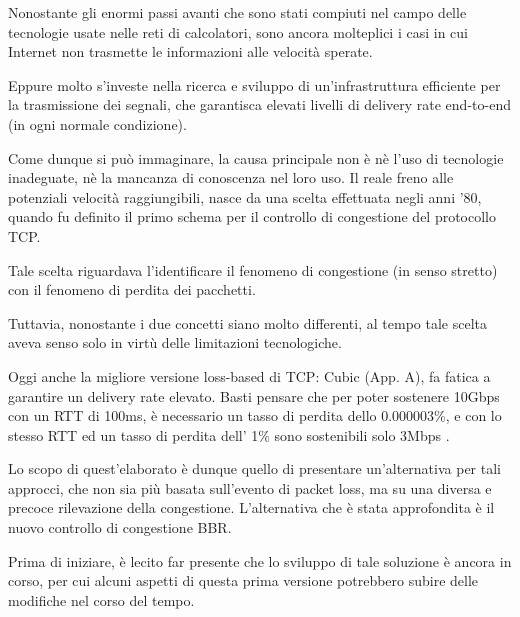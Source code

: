 Nonostante gli enormi passi avanti che sono stati compiuti nel campo delle tecnologie usate nelle reti di calcolatori, sono ancora molteplici i casi in cui Internet non trasmette le informazioni alle velocità sperate. \bigskip

Eppure molto s’investe nella ricerca e sviluppo di un’infrastruttura efficiente per la trasmissione dei segnali, che garantisca elevati livelli di delivery rate end-to-end (in ogni normale condizione). \bigskip

Come dunque si può immaginare, la causa principale non è nè l’uso di tecnologie inadeguate, nè la mancanza di conoscenza nel loro uso. Il reale freno alle potenziali velocità raggiungibili, nasce da una scelta effettuata negli anni '80, quando fu definito il primo schema per il controllo di congestione del protocollo TCP. \bigskip

Tale scelta riguardava l’identificare il fenomeno di congestione (in senso stretto) con il fenomeno di perdita dei pacchetti. \bigskip

Tuttavia, nonostante i due concetti siano molto differenti, al tempo tale scelta aveva senso solo in virtù delle limitazioni tecnologiche. \bigskip

Oggi anche la migliore versione loss-based di TCP: Cubic (App. A), fa fatica a garantire un delivery rate elevato. Basti pensare che per poter sostenere 10Gbps con un RTT di 100ms, è necessario un tasso di perdita dello 0.000003\%, e con lo stesso RTT ed un tasso di perdita dell’ 1\% sono sostenibili solo 3Mbps \cite[p.~12]{ietf:draft-ietf-tcpm-cubic-05}. \bigskip

Lo scopo di quest'elaborato è dunque quello di presentare un'alternativa per tali approcci, che non sia più basata sull'evento di packet loss, ma su una diversa e precoce rilevazione della congestione. L'alternativa che è stata approfondita è il nuovo controllo di congestione BBR. \bigskip

Prima di iniziare, è lecito far presente che lo sviluppo di tale soluzione è ancora in corso, per cui alcuni aspetti di questa prima versione potrebbero subire delle modifiche nel corso del tempo.